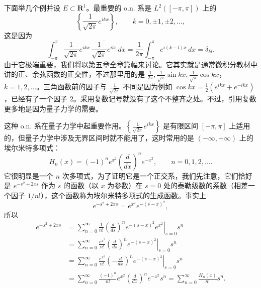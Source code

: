 下面举几个例并设 $E\subset\mathbf R^1$。最重要的 o.n. 系是 $L^2([ -\pi,\pi])$ 上的
\[
 \left\{\frac1{\sqrt{2\pi}}e^{ikx}\right\},\qquad k=0,\pm1,\pm2,\ldots,
\]
这是因为
\begin{equation}
 \int_{-\pi}^{\pi}\frac1{\sqrt{2\pi}}e^{ikx}\,\overline{\frac1{\sqrt{2\pi}}e^{ilx}}\,dx
 =\frac1{2\pi}\int_{-\pi}^{\pi}e^{i(k-l)x}\,dx=\delta_{kl}.
 \tag{12}
\end{equation}
由于它极端重要，我们将以第五章全章篇幅来讨论。它其实就是通常微积分教材中讲的正、余弦函数的正交性，不过那里用的是 $\frac1{2\pi},\frac1{\sqrt\pi}\sin kx,\frac1{\sqrt\pi}\cos kx$，$k=1,2,\ldots$。三角函数前的因子与 $\frac1{\sqrt{2\pi}}$ 不同是因为例如 $\cos kx=\frac12(e^{ikx}+e^{-ikx})$，已经有了一个因子 $2$。采用复数记号就没有了这个不整齐之处。不过，引用复数更多地是因为量子力学的需要。

这种 o.n. 系在量子力学中起重要作用。$\left\{\frac1{\sqrt{2\pi}}e^{ikx}\right\}$ 是有限区间 $[-\pi,\pi]$ 上适用的，但量子力学中涉及无界区间时就不能用了，这时常用的是 $(-\infty,+\infty)$ 上的埃尔米特多项式：
\begin{equation}
 H_n(x)=(-1)^ne^{x^2}\left(\frac d{dx}\right)^ne^{-x^2},\qquad n=0,1,2,\ldots.
 \tag{13}
\end{equation}
它很明显是一个 $n$ 次多项式，为了证明它是一个正交系，我们先注意，它们恰好是 $e^{-s^2+2xs}$ 作为 $s$ 的函数（以 $x$ 为参数）在 $s=0$ 处的泰勒级数的系数（相差一个因子 $1/n!$），这个函数称为埃尔米特多项式的生成函数。事实上
\[
 e^{-s^2+2xs}=e^{x^2}e^{-(s-x)^2},
\]
所以
\[
\begin{aligned}
 e^{-s^2+2xs}
 &=\sum_{n=0}^{\infty}\frac1{n!}\left.\left(\frac d{ds}\right)^ne^{-(s-x)^2}e^{x^2}\right|_{s=0}s^n\\
 &=\sum_{n=0}^{\infty}\frac{e^{x^2}}{n!}\left.\left(\frac d{ds}\right)^ne^{-(s-x)^2}\right|_{s=0}s^n\\
 &=\sum_{n=0}^{\infty}\frac{e^{x^2}}{n!}\left.\left(-\frac d{dx}\right)^ne^{-(s-x)^2}\right|_{s=0}s^n\\
 &=\sum_{n=0}^{\infty}\frac{(-1)^n}{n!}e^{x^2}\left(\frac d{dx}\right)^ne^{-x^2}s^n
 =\sum_{n=0}^{\infty}\frac{H_n(x)}{n!}s^n.
\end{aligned}
\]


